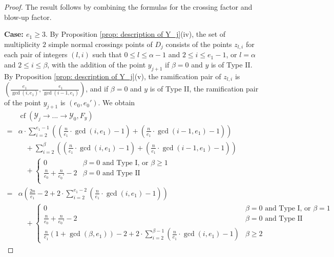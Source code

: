\documentclass[12pt]{amsart}
\numberwithin{equation}{section}
\theoremstyle{definition}
\newcommand{\Y}{\mathcal{Y}}
\newcommand{\tx}[1]{\text{#1}}
\DeclareMathOperator{\cf}{cf}
\begin{document}
\begin{proof}
    The result follows by combining the formulas for the crossing factor and blow-up factor.
    
    \textbf{Case: $e_1\geq 3$}. By Proposition \ref{prop: description of Y_j}(iv), the set of multiplicity $2$ simple normal crossings points of $D_j$ consists of the points $z_{l,i}$ for each pair of integers $(l,i)$ such that $0\leq l\leq\alpha-1$ and $2\leq i\leq e_1-1$, or $l=\alpha$ and $2\leq i\leq \beta$, with the addition of the point $y_{j+1}$ if $\beta=0$ and $y$ is of Type II. By Proposition \ref{prop: description of Y_j}(v), the ramification pair of $z_{l,i}$ is $(\frac{e_1}{\gcd(i,e_1)},\frac{e_1}{\gcd(i-1,e_1)})$, and if $\beta=0$ and $y$ is of Type II, the ramification pair of the point $y_{j+1}$ is $(e_0,e_0')$. We obtain
    \begin{align*}
        &\cf(\Y_j\to...\to\Y_0,F_y)\\=&\alpha\cdot\sum_{i=2}^{e_1-1}((\frac{n}{e_1}\cdot\gcd(i,e_1)-1)+(\frac{n}{e_1}\cdot\gcd(i-1,e_1)-1))\\
        &\quad+\sum_{i=2}^\beta((\frac{n}{e_1}\cdot\gcd(i,e_1)-1)+(\frac{n}{e_1}\cdot\gcd(i-1,e_1)-1))\\
        &\quad+\begin{cases}
            0&\beta=0\tx{ and Type I, or } \beta\geq 1\\
            \frac{n}{e_0}+\frac{n}{e_0'}-2&\beta=0\tx{ and Type II}\\
        \end{cases}\\
        =&\alpha(\frac{2n}{e_1}-2+2\cdot\sum_{i=2}^{e_1-2}(\frac{n}{e_1}\cdot\gcd(i,e_1)-1))\\
        &\quad+\begin{cases}
            0& \beta=0 \tx{ and Type I, or } \beta=1\\
            \frac{n}{e_0}+\frac{n}{e_0'}-2&\beta=0\tx{ and Type II}\\
            \frac{n}{e_1}(1+\gcd(\beta,e_1))-2+2\cdot\sum_{i=2}^{\beta-1}(\frac{n}{e_1}\cdot\gcd(i,e_1)-1)&\beta\geq 2
        \end{cases}
    \end{align*}
    

\end{proof}
\end{document}

